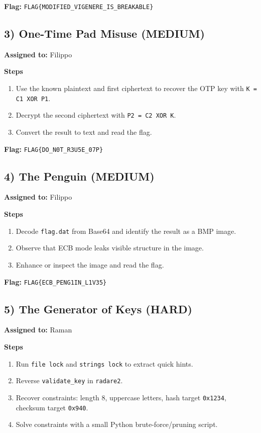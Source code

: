 \documentclass[10pt,a4paper]{article}
\begin{document}
\textbf{Flag:} \texttt{FLAG\{MODIFIED\_VIGENERE\_IS\_BREAKABLE\}}

\subsection*{3) One-Time Pad Misuse (MEDIUM)}
\textbf{Assigned to:} Filippo

\textbf{Steps}
\begin{enumerate}[leftmargin=*,noitemsep]
  \item Use the known plaintext and first ciphertext to recover the OTP key with \texttt{K = C1 XOR P1}.
  \item Decrypt the second ciphertext with \texttt{P2 = C2 XOR K}.
  \item Convert the result to text and read the flag.
\end{enumerate}

\textbf{Flag:} \texttt{FLAG\{DO\_N0T\_R3U5E\_07P\}}

\subsection*{4) The Penguin (MEDIUM)}
\textbf{Assigned to:} Filippo

\textbf{Steps}
\begin{enumerate}[leftmargin=*,noitemsep]
  \item Decode \texttt{flag.dat} from Base64 and identify the result as a BMP image.
  \item Observe that ECB mode leaks visible structure in the image.
  \item Enhance or inspect the image and read the flag.
\end{enumerate}

\textbf{Flag:} \texttt{FLAG\{ECB\_PENG1IN\_L1V35\}}


\subsection*{5) The Generator of Keys (HARD)}
\textbf{Assigned to:} Raman

\textbf{Steps}
\begin{enumerate}[leftmargin=*,noitemsep]
  \item Run \texttt{file lock} and \texttt{strings lock} to extract quick hints.
  \item Reverse \texttt{validate\_key} in \texttt{radare2}.
  \item Recover constraints: length 8, uppercase letters, hash target \texttt{0x1234}, checksum target \texttt{0x940}.
  \item Solve constraints with a small Python brute-force/pruning script.
\end{enumerate}
\end{document}

